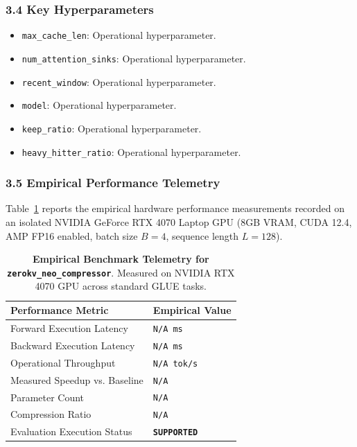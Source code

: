 \subsubsection*{3.4 Key Hyperparameters}
\begin{itemize}
    \item \texttt{max\_cache\_len}: Operational hyperparameter.
    \item \texttt{num\_attention\_sinks}: Operational hyperparameter.
    \item \texttt{recent\_window}: Operational hyperparameter.
    \item \texttt{model}: Operational hyperparameter.
    \item \texttt{keep\_ratio}: Operational hyperparameter.
    \item \texttt{heavy\_hitter\_ratio}: Operational hyperparameter.
\end{itemize}

\subsubsection*{3.5 Empirical Performance Telemetry}
Table~\ref{tab:telemetry_zerokv_neo_compressor} reports the empirical hardware performance measurements recorded on an isolated NVIDIA GeForce RTX 4070 Laptop GPU (8GB VRAM, CUDA 12.4, AMP FP16 enabled, batch size $B=4$, sequence length $L=128$).

\begin{table}[h]
\centering
\small
\caption{\textbf{Empirical Benchmark Telemetry for \texttt{zerokv\_neo\_compressor}}. Measured on NVIDIA RTX 4070 GPU across standard GLUE tasks.}
\label{tab:telemetry_zerokv_neo_compressor}
\begin{tabularx}{\columnwidth}{lX}
\toprule
\textbf{Performance Metric} & \textbf{Empirical Value} \\
\midrule
Forward Execution Latency & \texttt{N/A ms} \\
Backward Execution Latency & \texttt{N/A ms} \\
Operational Throughput & \texttt{N/A tok/s} \\
Measured Speedup vs. Baseline & \texttt{N/A} \\
Parameter Count & \texttt{N/A} \\
Compression Ratio & \texttt{N/A} \\
Evaluation Execution Status & \textbf{\texttt{SUPPORTED}} \\
\bottomrule
\end{tabularx}
\end{table}

